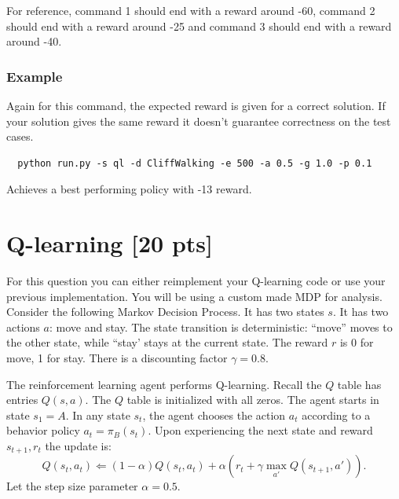 \documentclass[a4paper]{article}
\theoremstyle{definition}
\begin{document}
For reference, command 1 should end with a reward around -60, command 2 should end with a reward around -25 and command 3 should end with a reward around -40.

\subsubsection*{Example}

Again for this command, the expected reward is given for a correct solution. If your solution gives the same reward it doesn't guarantee correctness on the test cases.

\begin{verbatim}
  python run.py -s ql -d CliffWalking -e 500 -a 0.5 -g 1.0 -p 0.1  
\end{verbatim}

Achieves a best performing policy with -13 reward.

\section{Q-learning [20 pts]}
For this question you can either reimplement your Q-learning code or use your previous implementation. You will be using a custom made MDP for analysis. Consider the following Markov Decision Process.
It has two states $s$. It has two actions $a$: move and stay. The state transition is deterministic: ``move'' moves to the other state, while ``stay' stays at the current state. The reward $r$ is 0 for move,  1 for stay. There is a discounting factor $\gamma=0.8$.
\\


The reinforcement learning agent performs Q-learning.  Recall the $Q$ table has entries $Q(s,a)$. The $Q$ table is initialized with all zeros. The agent starts in state $s_1=A$. In any state $s_t$, the agent chooses the action $a_t$ according to a behavior policy $a_t = \pi_B(s_t)$. Upon experiencing the next state and reward $s_{t+1}, r_t$ the update is:
$$Q(s_t, a_t) \Leftarrow (1-\alpha) Q(s_t, a_t) + \alpha \left( r_t + \gamma \max_{a'} Q(s_{t+1}, a') \right).$$
Let the step size parameter $\alpha=0.5$.
\end{document}
